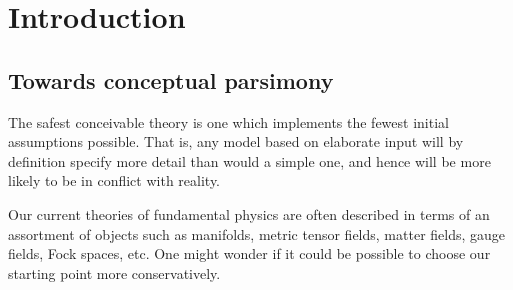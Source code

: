 \documentclass[letterpaper,12pt,titlepage,oneside,final]{book}
\begin{document}
 

\chapter{Introduction}
\section{Towards conceptual parsimony}






The safest conceivable theory is one which implements the fewest initial assumptions possible.
That is, any model based on elaborate input will by definition specify more detail than would a simple one, and hence will be more likely to be in conflict with reality.  

Our current theories of fundamental physics are often described in terms of an assortment of objects such as manifolds, metric tensor fields, matter fields, gauge fields, Fock spaces, etc. One might wonder if it could be possible to choose our starting point more conservatively.
\end{document}
